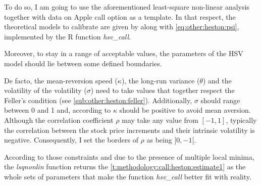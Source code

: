 \documentclass[12pt]{report}
\begin{document}
To do so, I am going to use the aforementioned least-square non-linear analysis together with data on Apple call option as a template.
In that respect, the theoretical models to calibrate are given by  along with \cref{eq:other:heston:psi}, implemented by the R function \textit{hsv\_call}.

Moreover, to stay in a range of acceptable values, the parameters of the HSV model should lie between some defined boundaries. 

De facto, the mean-reversion speed ($\kappa$), the long-run variance ($\theta$) and the volatility of the volatility ($\sigma$) need to take values that together respect the Feller's condition (see \cref{sub:other:heston:feller}). 
Additionally, $\sigma$ should range between 0 and 1 and, according to \citet{cristo2015} $\kappa$ should be positive to avoid mean aversion.
Although the correlation coefficient $\rho$ may take any value from $[-1, 1]$, typically the correlation between the stock price increments and their intrinsic volatility is negative. Consequently, I set the borders of $\rho$ as being $]0, -1[$.

According to those constraints and due to the presence of multiple local minima, the \textit{lsqnonlin} function returns the \cref{t:methodology:call:heston:estimate1} as the whole sets of parameters that make the function \textit{hsv\_call} better fit with reality.
\end{document}
